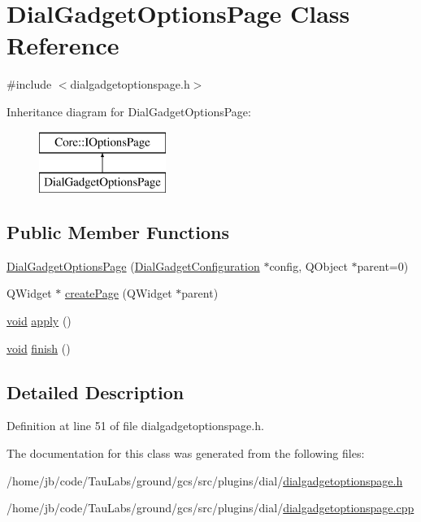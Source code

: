 \hypertarget{class_dial_gadget_options_page}{\section{\-Dial\-Gadget\-Options\-Page \-Class \-Reference}
\label{class_dial_gadget_options_page}
}


{\ttfamily \#include $<$dialgadgetoptionspage.\-h$>$}

\-Inheritance diagram for \-Dial\-Gadget\-Options\-Page\-:\begin{figure}[H]
\begin{center}
\leavevmode
\includegraphics[height=2.000000cm]{class_dial_gadget_options_page}
\end{center}
\end{figure}
\subsection*{\-Public \-Member \-Functions}
\begin{DoxyCompactItemize}
\item 
\hyperlink{group___dial_plugin_gaeac54ffbddafca4f7d4b61d9d8af758a}{\-Dial\-Gadget\-Options\-Page} (\hyperlink{class_dial_gadget_configuration}{\-Dial\-Gadget\-Configuration} $\ast$config, \-Q\-Object $\ast$parent=0)
\item 
\-Q\-Widget $\ast$ \hyperlink{group___dial_plugin_gac2ea2636090b7981bddc06307c640fbb}{create\-Page} (\-Q\-Widget $\ast$parent)
\item 
\hyperlink{group___u_a_v_objects_plugin_ga444cf2ff3f0ecbe028adce838d373f5c}{void} \hyperlink{group___dial_plugin_gaacfb7eb82dfc96795090f651e40bd640}{apply} ()
\item 
\hyperlink{group___u_a_v_objects_plugin_ga444cf2ff3f0ecbe028adce838d373f5c}{void} \hyperlink{group___dial_plugin_gacc0c745076376c99081b3c52d916e209}{finish} ()
\end{DoxyCompactItemize}


\subsection{\-Detailed \-Description}


\-Definition at line 51 of file dialgadgetoptionspage.\-h.



\-The documentation for this class was generated from the following files\-:\begin{DoxyCompactItemize}
\item 
/home/jb/code/\-Tau\-Labs/ground/gcs/src/plugins/dial/\hyperlink{dialgadgetoptionspage_8h}{dialgadgetoptionspage.\-h}\item 
/home/jb/code/\-Tau\-Labs/ground/gcs/src/plugins/dial/\hyperlink{dialgadgetoptionspage_8cpp}{dialgadgetoptionspage.\-cpp}\end{DoxyCompactItemize}
